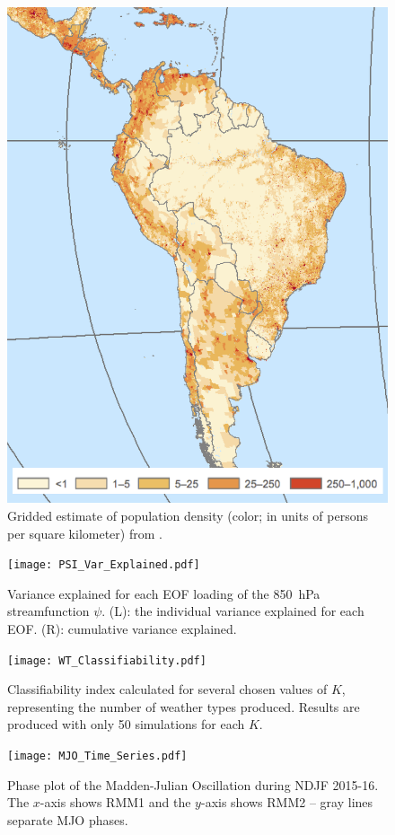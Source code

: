 \documentclass{article}
\begin{document}
\begin{figure}
	\centering
  \includegraphics[width=\textwidth,height=0.6\textheight,keepaspectratio=true]{gpw-v4-2015.png}
	\caption{
		Gridded estimate of population density (color; in units of persons per square kilometer) from \citet{GPWv4}.
	}
\end{figure}

\begin{figure}
  \texttt{[image: PSI\_Var\_Explained.pdf]}
	\caption{
		Variance explained for each EOF loading of the \SI{850}{\hecto\pascal} streamfunction $\psi$.
    (L): the individual variance explained for each EOF.
		(R): cumulative variance explained.
	}
\end{figure}

\begin{figure}
  \texttt{[image: WT\_Classifiability.pdf]}
	\caption{
		Classifiability index \citep[see Methods and][]{Michelangeli1995} calculated for several chosen values of $K$, representing the number of weather types produced.
		Results are produced with only 50 simulations for each $K$.
	}
\end{figure}

\begin{figure}
  \texttt{[image: MJO\_Time\_Series.pdf]}
	\caption{
		Phase plot of the Madden-Julian Oscillation during NDJF 2015-16.
		The $x$-axis shows RMM1 and the $y$-axis shows RMM2 -- gray lines separate MJO phases.
	}
	\label{fig:mjo-ts}
\end{figure}

\clearpage


\end{document}
